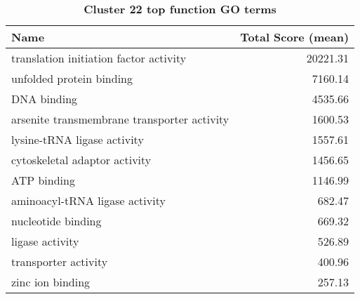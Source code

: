 \begin{table}[hp]
\begin{center} \sf
\begin{tabular}{p{}r}
\toprule
\textbf{Name}                               & \textbf{Total Score (mean)} \\ \midrule
translation initiation factor activity      & 20221.31                    \\
unfolded protein binding                    & 7160.14                     \\
DNA binding                                 & 4535.66                     \\
arsenite transmembrane transporter activity & 1600.53                     \\
lysine-tRNA ligase activity                 & 1557.61                     \\
cytoskeletal adaptor activity               & 1456.65                     \\
ATP binding                                 & 1146.99                     \\
aminoacyl-tRNA ligase activity              & 682.47                      \\
nucleotide binding                          & 669.32                      \\
ligase activity                             & 526.89                      \\
transporter activity                        & 400.96                      \\
zinc ion binding                            & 257.13                      \\ \bottomrule                     
\end{tabular}
\end{center}

\caption[Cluster 22 top function GO terms]{\sf \textbf{Cluster 22 top function GO terms}}
\label{tab:cls22-function}
\end{table}